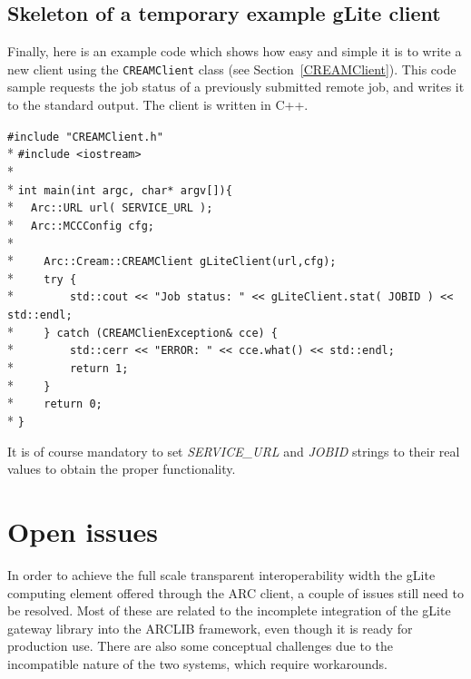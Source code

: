 \documentclass{article}
\begin{document}
\subsection{Skeleton of a temporary example gLite client}
Finally, here is an example code which shows how easy and simple it is to write a new client using the \texttt{CREAMClient} class (see Section~\ref{CREAMClient}). This code sample requests the job status of a previously submitted remote job, and writes it to the standard output. The client is written in C++.
\begin{framed}
\verb?#include "CREAMClient.h"?\\*
\verb?#include <iostream>?\\*
\\*
\verb?int main(int argc, char* argv[]){?\\*
\verb?  Arc::URL url( SERVICE_URL );?\\*
\verb?  Arc::MCCConfig cfg;?\\*
\\*
\verb?    Arc::Cream::CREAMClient gLiteClient(url,cfg);?\\*
\verb?    try {?\\*
\verb?        std::cout << "Job status: " << gLiteClient.stat( JOBID ) << std::endl;?\\*
\verb?    } catch (CREAMClienException& cce) {?\\*
\verb?        std::cerr << "ERROR: " << cce.what() << std::endl;?\\*
\verb?        return 1;?\\*
\verb?    }?\\*
\verb?    return 0;?\\*
\verb?}?
\end{framed}%
It is of course mandatory to set \textit{SERVICE\_URL} and \textit{JOBID} strings to their real values to obtain the proper functionality.

\section{Open issues}
In order to achieve the full scale transparent interoperability width the gLite computing element offered through the ARC client, a couple of issues still need to be resolved. Most of these are related to the incomplete integration of the gLite gateway library into the ARCLIB framework, even though it is ready for production use. There are also some conceptual challenges due to the incompatible nature of the two systems, which require workarounds.
\end{document}
